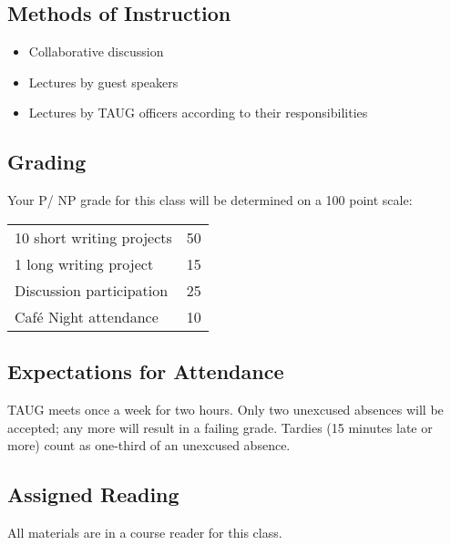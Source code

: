 \subsection{Methods of Instruction}
\begin{itemize}
	\item Collaborative discussion
	\item Lectures by guest speakers
	\item Lectures by TAUG officers according to their responsibilities
\end{itemize}

\subsection{Grading}
Your P/ NP grade for this class will be determined on a 100 point scale:

\begin{center}
	\begin{tabular}{lr}
		10 short writing projects & 50 \\
		1 long writing project & 15 \\
		Discussion participation & 25 \\
		Caf\'e Night attendance & 10
	\end{tabular}
\end{center}

\subsection{Expectations for Attendance}
TAUG meets once a week for two hours. Only two unexcused absences will be accepted; any more will result in a failing grade. Tardies (15 minutes late or more) count as one-third of an unexcused absence.

\subsection{Assigned Reading}
All materials are in a course reader for this class.
